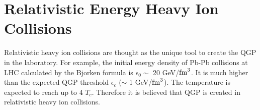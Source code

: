 

\section{Relativistic Energy Heavy Ion Collisions}
Relativistic heavy ion collisions are thought as the unique tool to create the QGP in the laboratory.
For example, the initial energy density of Pb-Pb collisions at LHC calculated by the Bjorken formula is $\epsilon_{0}\sim$ 20 GeV/$\rm{fm}^{3}$. 
It is much higher than the expected QGP threshold $\epsilon_{c}$ ($\sim$ 1 GeV/$\rm{fm}^{3}$).
The temperature is expected to reach up to 4 $T_{c}$.
Therefore it is believed that QGP is created in relativistic heavy ion collisions. 

